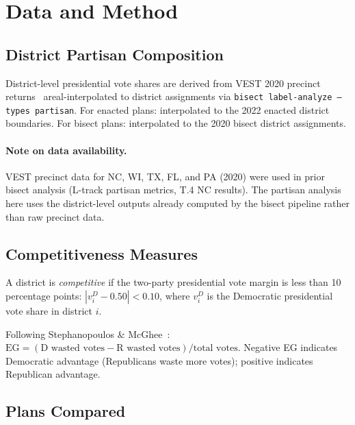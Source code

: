 \section{Data and Method}

\subsection{District Partisan Composition}

District-level presidential vote shares are derived from VEST 2020 precinct
returns~\citep{vest2022} areal-interpolated to district assignments via
\texttt{bisect label-analyze --types partisan}.
For enacted plans: interpolated to the 2022 enacted district boundaries.
For bisect plans: interpolated to the 2020 bisect district assignments.

\paragraph{Note on data availability.}
VEST precinct data for NC, WI, TX, FL, and PA (2020) were used in prior bisect
analysis (L-track partisan metrics, T.4 NC results).
The partisan analysis here uses the district-level outputs already computed
by the bisect pipeline rather than raw precinct data.

\subsection{Competitiveness Measures}

\begin{definition}
A district is \emph{competitive} if the two-party presidential vote margin is
less than 10 percentage points: $|v_i^D - 0.50| < 0.10$, where $v_i^D$ is
the Democratic presidential vote share in district $i$.
\end{definition}

\begin{definition}
Following Stephanopoulos \& McGhee~\citep{stephanopoulos2015partisan}:
$\mathrm{EG} = (\text{D wasted votes} - \text{R wasted votes}) / \text{total votes}$.
Negative EG indicates Democratic advantage (Republicans waste more votes);
positive indicates Republican advantage.
\end{definition}

\subsection{Plans Compared}

